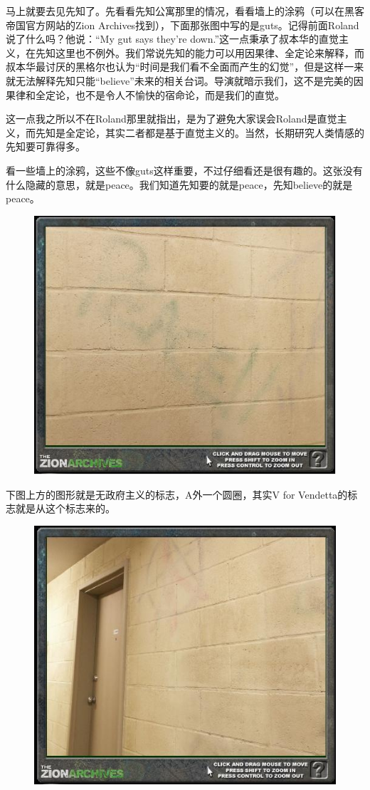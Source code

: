 \documentclass[UTF8]{ctexart}
\begin{document}
马上就要去见先知了。先看看先知公寓那里的情况，看看墙上的涂鸦（可以在黑客帝国官方网站的Zion Archives找到），下面那张图中写的是guts。记得前面Roland说了什么吗？他说：“My gut says they're down.”这一点秉承了叔本华的直觉主义，在先知这里也不例外。我们常说先知的能力可以用因果律、全定论来解释，而叔本华最讨厌的黑格尔也认为“时间是我们看不全面而产生的幻觉”，但是这样一来就无法解释先知只能“believe”未来的相关台词。导演就暗示我们，这不是完美的因果律和全定论，也不是令人不愉快的宿命论，而是我们的直觉。

这一点我之所以不在Roland那里就指出，是为了避免大家误会Roland是直觉主义，而先知是全定论，其实二者都是基于直觉主义的。当然，长期研究人类情感的先知要可靠得多。

看一些墙上的涂鸦，这些不像guts这样重要，不过仔细看还是很有趣的。这张没有什么隐藏的意思，就是peace。我们知道先知要的就是peace，先知believe的就是peace。

\begin{figure}[htb]
\centering
\includegraphics[width=0.5\linewidth]{fig/27d5d1a2c52f2dadcaefd05a.jpg}
\end{figure}

下图上方的图形就是无政府主义的标志，A外一个圆圈，其实V for Vendetta的标志就是从这个标志来的。

\begin{figure}[htb]
\centering
\includegraphics[width=0.5\linewidth]{fig/45c00df4fb76d7ef7709d75a.jpg}
\end{figure}
\end{document}
